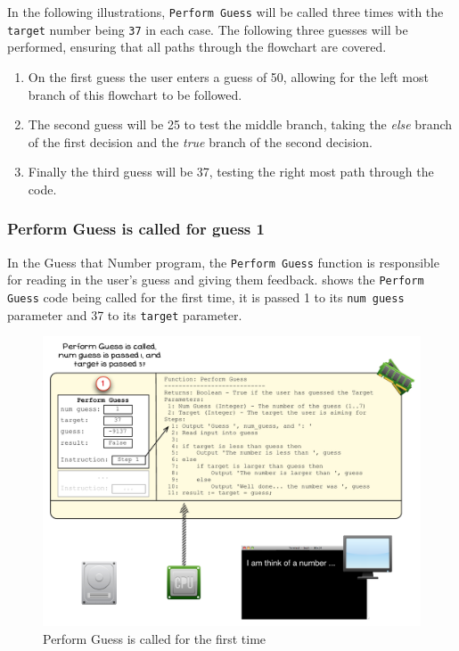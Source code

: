 In the following illustrations, \texttt{Perform Guess} will be called three times with the \texttt{target} number being \texttt{37} in each case. The following three guesses will be performed, ensuring that all paths through the flowchart are covered.
\begin{enumerate}
  \item On the first guess the user enters a guess of 50, allowing for the left most branch of this flowchart to be followed. 
  \item The second guess will be 25 to test the middle branch, taking the \emph{else} branch of the first decision and the \emph{true} branch of the second decision. 
  \item Finally the third guess will be 37, testing the right most path through the code.
\end{enumerate}


\clearpage
\subsubsection{Perform Guess is called for guess 1} %
\label{ssub:perform_guess_is_called_for_the_first_time}

In the Guess that Number program, the \texttt{Perform Guess} function is responsible for reading in the user's guess and giving them feedback.  shows the \texttt{Perform Guess} code being called for the first time, it is passed 1 to its \texttt{num guess} parameter and 37 to its \texttt{target} parameter.

\begin{figure}[htbp]
   \centering
   \includegraphics[width=\textwidth]{./topics/control-flow/images/PerformGuess1} 
   \caption{Perform Guess is called for the first time}
   \label{fig:perform-guess-1}
\end{figure}

